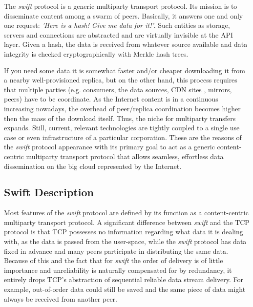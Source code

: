 
The \emph{swift} protocol is a generic multiparty transport protocol. Its mission is to disseminate content among a 
swarm of peers. Basically, it answers one and only one request: \emph{'Here is a hash! Give me data for it!'}. Such
entities as storage, servers and connections are abstracted and are virtually invisible at the API layer. Given a hash,
the data is received from whatever source available and data integrity is checked cryptographically with Merkle hash
trees.

If you need some data it is somewhat faster and/or cheaper downloading it from a nearby well-provisioned replica, but 
on the other hand, this process requires that multiple parties (e.g. consumers, the data sources, CDN
sites\cite{cdnwiki} , mirrors, peers) have to be coordinate. As the Internet content  is in a continuous increasing
nowadays, the overhead of peer/replica coordination becomes higher then the mass of the download itself. Thus, the niche
for multiparty transfers expands. Still, current, relevant technologies are tightly coupled to a single use case or even
infrastructure of a particular corporation. These are the reasons of the \emph{swift} protocol appearance with its
primary goal to act as a generic content-centric multiparty transport protocol that allows seamless, effortless data
dissemination on the big cloud represented by the Internet.

\subsection{Swift Description}

Most features of the \emph{swift} protocol are defined by its function as a content-centric multiparty transport 
protocol. A significant difference between \emph{swift} and the TCP protocol is that TCP possesses no information
regarding what data it is dealing with, as the data is passed from the user-space, while the \emph{swift} protocol has
data fixed in advance and many peers participate in distributing the same data. Because of this and the fact that for
\emph{swift} the order of delivery is of little importance and unreliability is naturally compensated for by redundancy,
it entirely drops TCP's abstraction of sequential reliable data stream delivery. For example, out-of-order data could
still be saved and the same piece of data might always be received from another peer.


